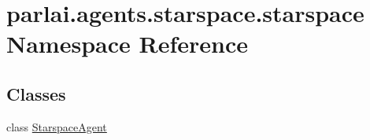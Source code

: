 \hypertarget{namespaceparlai_1_1agents_1_1starspace_1_1starspace}{}\section{parlai.\+agents.\+starspace.\+starspace Namespace Reference}
\label{namespaceparlai_1_1agents_1_1starspace_1_1starspace}
\subsection*{Classes}
\begin{DoxyCompactItemize}
\item 
class \hyperlink{classparlai_1_1agents_1_1starspace_1_1starspace_1_1StarspaceAgent}{Starspace\+Agent}
\end{DoxyCompactItemize}
